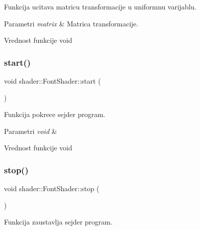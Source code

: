 Funkcija ucitava matricu transformacije u uniformnu varijablu. 


\begin{DoxyParams}{Parametri}
{\em matrix} & Matrica transformacije. \\
\hline
\end{DoxyParams}
\begin{DoxyReturn}{Vrednost funkcije}
void 
\end{DoxyReturn}
\mbox{\label{classshader_1_1FontShader_a15d46dfb7b060d5b067b2df5be395081}} 
\subsubsection{\texorpdfstring{start()}{start()}}
{\footnotesize\ttfamily void shader\+::\+Font\+Shader\+::start (\begin{DoxyParamCaption}\item[{void}]{ }\end{DoxyParamCaption})}



Funkcija pokrece sejder program. 


\begin{DoxyParams}{Parametri}
{\em void} & \\
\hline
\end{DoxyParams}
\begin{DoxyReturn}{Vrednost funkcije}
void 
\end{DoxyReturn}
\mbox{\label{classshader_1_1FontShader_a5cf531aabad7073196cddda0d2514392}} 
\subsubsection{\texorpdfstring{stop()}{stop()}}
{\footnotesize\ttfamily void shader\+::\+Font\+Shader\+::stop (\begin{DoxyParamCaption}\item[{void}]{ }\end{DoxyParamCaption})}



Funkcija zaustavlja sejder program. 


